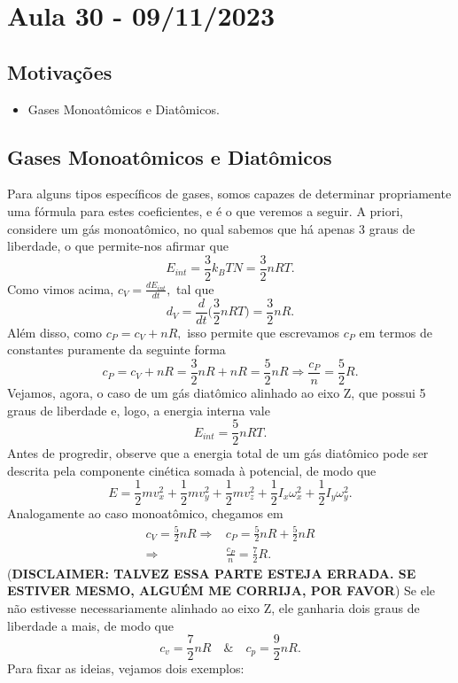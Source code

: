 \documentclass[PhysicsII/phsyicsII_notes.tex]{subfiles}
\begin{document}
\section{Aula 30 - 09/11/2023}
\subsection{Motivações}
\begin{itemize}
	\item Gases Monoatômicos e Diatômicos.
\end{itemize}
\subsection{Gases Monoatômicos e Diatômicos}
Para alguns tipos específicos de gases, somos capazes de determinar propriamente uma fórmula para estes coeficientes, e é o que veremos a seguir.
A priori, considere um gás monoatômico, no qual sabemos que há apenas 3 graus de liberdade, o que permite-nos afirmar que
\[
	E_{int} = \frac{3}{2}k_{B}TN = \frac{3}{2}nRT.
\]
Como vimos acima, \(c_{V} = \frac{dE_{int}}{dt},\) tal que
\[
	d_{V} = \frac{d}{dt}\biggl(\frac{3}{2}nRT\biggr) = \frac{3}{2}nR.
\]
Além disso, como \(c_{P} = c_{V} + nR,\) isso permite que escrevamos \(c_{P}\) em termos de constantes puramente da seguinte
forma
\[
	c_{P} = c_{V} + nR = \frac{3}{2}nR + nR = \frac{5}{2}nR \Rightarrow \frac{c_{P}}{n} = \frac{5}{2}R.
\]
Vejamos, agora, o caso de um gás diatômico alinhado ao eixo Z, que possui 5 graus de liberdade e, logo, a energia interna vale
\[
	E_{int} = \frac{5}{2}nRT.
\]
Antes de progredir, observe que a energia total de um gás diatômico pode ser descrita pela componente cinética somada à potencial, de modo que
\[
	E = \frac{1}{2}mv_{x}^{2} + \frac{1}{2}mv_{y}^{2} + \frac{1}{2}mv_{z}^{2} + \frac{1}{2}I_{x}\omega_{x}^{2} + \frac{1}{2}I_{y}\omega_{y}^{2}.
\]
Analogamente ao caso monoatômico, chegamos em
\begin{align*}
	c_{V} = \frac{5}{2}nR \Rightarrow & c_{P} = \frac{5}{2}nR + \frac{5}{2}nR \\
	\Rightarrow                       & \frac{c_{P}}{n} = \frac{7}{2}R.
\end{align*}
(\textbf{DISCLAIMER: TALVEZ ESSA PARTE ESTEJA ERRADA. SE ESTIVER MESMO, ALGUÉM ME CORRIJA, POR FAVOR}) Se ele não estivesse necessariamente alinhado ao eixo Z, ele ganharia dois graus de liberdade a mais,
de modo que
\[
	c_{v} = \frac{7}{2}nR \quad\&\quad c_{p} = \frac{9}{2}nR.
\]
Para fixar as ideias, vejamos dois exemplos:
\end{document}
